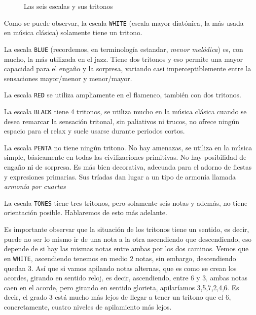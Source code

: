 \documentclass[]{article}
\begin{document}
\begin{figure}
\begin{subfigure}{0.15\textwidth}
    \caption{}
    \label{fig:tikz2}
  \end{subfigure}
  \hfill
  \caption{Las seis escalas y sus tritonos}
  \label{fig:the-six-scales-and-tritones}
\end{figure}


Como se puede observar, la escala \texttt{WHITE} (escala mayor diatónica, la más usada en música clásica) solamente tiene un tritono.

La escala \texttt{BLUE} (recordemos, en terminología estandar, \emph{menor melódica}) es, con mucho, la más utilizada en el jazz. Tiene dos tritonos y eso permite una mayor capacidad para el engaño y la sorpresa, variando casi imperceptiblemente entre la sensaciones mayor/menor y menor/mayor.

La escala \texttt{RED} se utiliza ampliamente en el flamenco, también con dos tritonos.

La escala \texttt{BLACK} tiene 4 tritonos, se utiliza mucho en la música clásica cuando se desea remarcar la sensación tritonal, sin paliativos ni trucos, no ofrece ningún espacio para el relax y suele usarse durante periodos cortos.

La escala \texttt{PENTA} no tiene ningún tritono. No hay amenazas, se utiliza en la música simple, básicamente en todas las civilizaciones primitivas. No hay posibilidad de engaño ni de sorpresa. Es más bien decorativa, adecuada para el adorno de fiestas y expresiones primarias. Sus tríadas dan lugar a un tipo de armonía llamada \emph{armonía por cuartas }

La escala \texttt{TONES} tiene tres tritonos, pero solamente seis notas y además, no tiene orientación posible. Hablaremos de esto más adelante.

Es importante observar que la situación de los tritonos tiene un sentido, es decir, puede no ser lo mismo ir de una nota a la otra ascendiendo que descendiendo, eso depende de si hay las mismas notas entre ambas por los dos caminos. Vemos que en \texttt{WHITE}, ascendiendo tenemos en medio 2 notas, sin embargo, descendiendo quedan 3. Así que si vamos apilando notas alternas, que es como se crean los acordes, girando en sentido reloj, es decir, ascendiendo, entre 6 y 3, ambas notas caen en el acorde, pero girando en sentido glorieta, apilaríamos 3,5,7,2,4,6. Es decir, el grado 3 está mucho más lejos de llegar a tener un tritono que el 6, concretamente, cuatro niveles de apilamiento más lejos.
\end{document}
